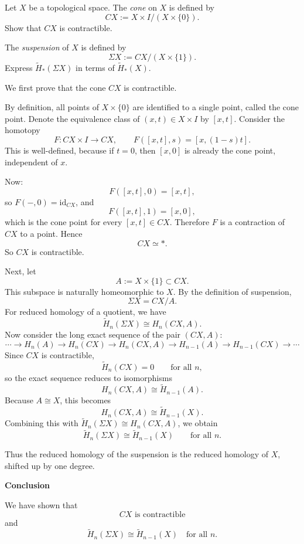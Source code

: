 \begin{problem}
Let \(X\) be a topological space. The \emph{cone} on \(X\) is defined by
\[
CX := X\times I /(X\times \{0\}).
\]
Show that \(CX\) is contractible.

The \emph{suspension} of \(X\) is defined by
\[
\Sigma X := CX /(X\times \{1\}).
\]
Express \(\widetilde H_*(\Sigma X)\) in terms of \(\widetilde H_*(X)\).
\end{problem}

\begin{solution}
\noindent
We first prove that the cone \(CX\) is contractible.

By definition, all points of \(X\times \{0\}\) are identified to a single point, called the cone point. Denote the equivalence class of \((x,t)\in X\times I\) by \([x,t]\). Consider the homotopy
\[
F:CX\times I \longrightarrow CX,
\qquad
F([x,t],s)=[x,(1-s)t].
\]
This is well-defined, because if \(t=0\), then \([x,0]\) is already the cone point, independent of \(x\).

Now:
\[
F([x,t],0)=[x,t],
\]
so \(F(-,0)=\mathrm{id}_{CX}\), and
\[
F([x,t],1)=[x,0],
\]
which is the cone point for every \([x,t]\in CX\). Therefore \(F\) is a contraction of \(CX\) to a point. Hence
\[
CX \simeq *.
\]
So \(CX\) is contractible.

Next, let
\[
A:=X\times \{1\}\subset CX.
\]
This subspace is naturally homeomorphic to \(X\). By the definition of suspension,
\[
\Sigma X = CX/A.
\]
For reduced homology of a quotient, we have
\[
\widetilde H_n(\Sigma X)\cong H_n(CX,A).
\]
Now consider the long exact sequence of the pair \((CX,A)\):
\[
\cdots \to H_n(A)\to H_n(CX)\to H_n(CX,A)\to H_{n-1}(A)\to H_{n-1}(CX)\to \cdots
\]
Since \(CX\) is contractible,
\[
\widetilde H_n(CX)=0
\qquad \text{for all } n,
\]
so the exact sequence reduces to isomorphisms
\[
H_n(CX,A)\cong \widetilde H_{n-1}(A).
\]
Because \(A\cong X\), this becomes
\[
H_n(CX,A)\cong \widetilde H_{n-1}(X).
\]
Combining this with \(\widetilde H_n(\Sigma X)\cong H_n(CX,A)\), we obtain
\[
\widetilde H_n(\Sigma X)\cong \widetilde H_{n-1}(X)
\qquad \text{for all } n.
\]

Thus the reduced homology of the suspension is the reduced homology of \(X\), shifted up by one degree.


\medskip
\noindent\textbf{Conclusion}\par
\smallskip


We have shown that
\[
CX \text{ is contractible}
\]
and
\[
\boxed{\widetilde H_n(\Sigma X)\cong \widetilde H_{n-1}(X)\quad \text{for all } n.}
\]
\end{solution}


